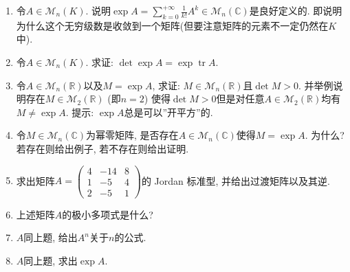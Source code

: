 \documentclass[
  a4paper,
]{article}
\DeclareMathOperator{\tr}{tr}
\providecommand{\tightlist}{\setlength{\itemsep}{0pt}\setlength{\parskip}{0pt}}
\begin{document}
\begin{enumerate}
  \begin{enumerate}
  \def\labelenumii{\arabic{enumii}.}
  \tightlist
  \item
    令\(A \in \mathcal{M}_n(K)\).
    说明\(\exp A = \sum\limits_{k = 0}^{+\infty} \frac{1}{k!} A^k \in \mathcal{M}_n(\mathbb{C})\)是良好定义的.
    即说明为什么这个无穷级数是收敛到一个矩阵(但要注意矩阵的元素不一定仍然在\(K\)中).
  \item
    令\(A \in \mathcal{M}_n(K)\). 求证: \(\det \exp A = \exp \tr A\).
  \item
    令\(A \in \mathcal{M}_n(\mathbb{R})\)以及\(M = \exp A\), 求证:
    \(M \in \mathcal{M}_n(\mathbb{R})\)且\(\det M > 0\).
    并举例说明存在\(M \in \mathcal{M}_2(\mathbb{R})\) (即\(n = 2\))
    使得\(\det M > 0\)但是对任意\(A \in \mathcal{M}_2(\mathbb{R})\)均有\(M \neq \exp A\).
    提示: \(\exp A\)总是可以''开平方''的.
  \item
    令\(M \in \mathcal{M}_n(\mathbb{C})\)为幂零矩阵,
    是否存在\(A \in \mathcal{M}_n(\mathbb{C})\)使得\(M = \exp A\).
    为什么? 若存在则给出例子, 若不存在则给出证明.
  \item
    求出矩阵\(A = \begin{pmatrix} 4 & -14 & 8 \\ 1 & -5 & 4 \\ 2 & -5 & 1 \end{pmatrix}\)的
    Jordan 标准型, 并给出过渡矩阵以及其逆.
  \item
    上述矩阵\(A\)的极小多项式是什么?
  \item
    \(A\)同上题, 给出\(A^n\)关于\(n\)的公式.
  \item
    \(A\)同上题, 求出\(\exp A\).
  \end{enumerate}
\end{enumerate}
\end{document}
